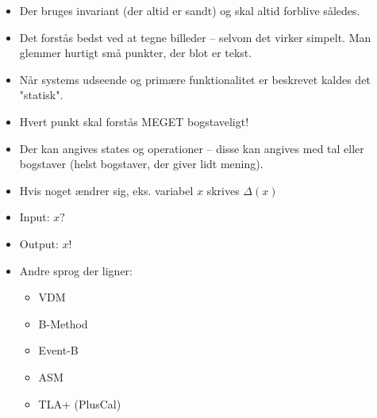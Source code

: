\documentclass[a4, 10pt]{article}
\begin{document}
\begin{itemize}
	\item Der bruges invariant (der altid er sandt) og skal altid forblive således.
	\item Det forstås bedst ved at tegne billeder -- selvom det virker simpelt.
	\subitem Man glemmer hurtigt små punkter, der blot er tekst.
	\item Når systems udseende og primære funktionalitet er beskrevet kaldes det "statisk".
	\item Hvert punkt skal forstås MEGET bogstaveligt!
	\item Der kan angives states og operationer -- disse kan angives med tal eller bogstaver (helst bogstaver, der giver lidt mening).
	\item Hvis noget ændrer sig, eks. variabel $x$ skrives $\Delta(x)$
	\item Input: $x?$
	\item Output: $x!$
	\item Andre sprog der ligner:

	\begin{itemize}
		\item VDM
		\item B-Method
		\item Event-B
		\item ASM
		\item TLA+ (PlusCal)
	\end{itemize}
\end{itemize}
\end{document}
